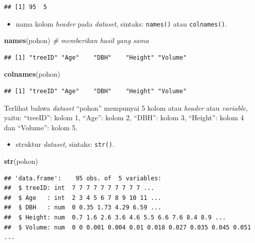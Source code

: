 \documentclass[
  12pt,
  a4paper,
]{scrbook}
\newenvironment{Shaded}{\begin{snugshade}}{\end{snugshade}}
\newcommand{\CommentTok}[1]{\textcolor[rgb]{0.56,0.35,0.01}{\textit{#1}}}
\newcommand{\KeywordTok}[1]{\textcolor[rgb]{0.13,0.29,0.53}{\textbf{#1}}}
\newcommand{\NormalTok}[1]{#1}
\providecommand{\tightlist}{%
  \setlength{\itemsep}{0pt}\setlength{\parskip}{0pt}}
\begin{document}
\begin{verbatim}
## [1] 95  5
\end{verbatim}

\begin{itemize}
\tightlist
\item
  nama kolom \emph{header} pada \emph{dataset}, sintaks:
  \texttt{names()} atau \texttt{colnames()}.
\end{itemize}

\begin{Shaded}
\begin{Highlighting}[]
\KeywordTok{names}\NormalTok{(pohon)  }\CommentTok{# memberikan hasil yang sama}
\end{Highlighting}
\end{Shaded}

\begin{verbatim}
## [1] "treeID" "Age"    "DBH"    "Height" "Volume"
\end{verbatim}

\begin{Shaded}
\begin{Highlighting}[]
\KeywordTok{colnames}\NormalTok{(pohon)}
\end{Highlighting}
\end{Shaded}

\begin{verbatim}
## [1] "treeID" "Age"    "DBH"    "Height" "Volume"
\end{verbatim}

Terlihat bahwa \emph{dataset} ``pohon'' mempunyai 5 kolom atau
\emph{header} atau \emph{variable}, yaitu: ``treeID'': kolom 1, ``Age'':
kolom 2, ``DBH'': kolom 3, ``Height'': kolom 4 dan ``Volume'': kolom 5.

\newpage

\begin{itemize}
\tightlist
\item
  struktur \emph{dataset}, sintaks: \texttt{str()}.
\end{itemize}

\begin{Shaded}
\begin{Highlighting}[]
\KeywordTok{str}\NormalTok{(pohon)}
\end{Highlighting}
\end{Shaded}

\begin{verbatim}
## 'data.frame':    95 obs. of  5 variables:
##  $ treeID: int  7 7 7 7 7 7 7 7 7 7 ...
##  $ Age   : int  2 3 4 5 6 7 8 9 10 11 ...
##  $ DBH   : num  0 0.35 1.73 4.29 6.59 ...
##  $ Height: num  0.7 1.6 2.6 3.6 4.6 5.5 6.6 7.6 8.4 8.9 ...
##  $ Volume: num  0 0 0.001 0.004 0.01 0.018 0.027 0.035 0.045 0.051 ...
\end{verbatim}
\end{document}
